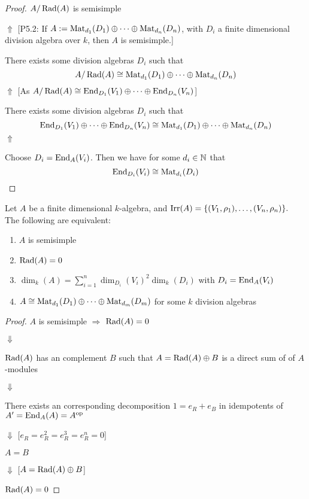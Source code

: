 \begin{proof}
\(A/\operatorname{Rad}(A)\) is semisimple

\(\Uparrow \) [P5.2: If \(A:=\operatorname{Mat}_{d_{1}}(D_{1})\oplus \cdots \oplus \operatorname{Mat}_{d_{n}}(D_{n})\), with \(D_{i}\) a finite dimensional division algebra over \(k\), then \(A\) is semisimple.]

There exists some division algebras \(D_{i}\) such that
\[
A/\operatorname{Rad}(A)\cong \operatorname{Mat}_{d_{1}}(D_{1})\oplus \cdots \oplus \operatorname{Mat}_{d_{n}}(D_{n})
\]
\(\Uparrow \) [As $A/\operatorname{Rad}(A) \cong \operatorname{End}_{D_{1}}(V_{1})\oplus \cdots \oplus \operatorname{End}_{D_{n}}(V_{n})$]

There exists some division algebras \(D_{i}\) such that
\[
\operatorname{End}_{D_{1}}(V_{1})\oplus \cdots \oplus \operatorname{End}_{D_{n}}(V_{n})\cong \operatorname{Mat}_{d_{1}}(D_{1})\oplus \cdots \oplus \operatorname{Mat}_{d_{n}}(D_{n})
\]
\(\Uparrow \)

Choose \(D_{i}=\operatorname{End}_A(V_{i})\). Then we have for some \(d_{i}\in \Bbb{N}\) that
\[
\operatorname{End}_{D_{i}}(V_{i})\cong \operatorname{Mat}_{d_{i}}(D_{i})
\]
\end{proof}

\begin{thm}
Let \(A\) be a finite dimensional \(k\)-algebra, and \(\operatorname{Irr}(A)=\{(V_{1},\rho _{1}),\ldots ,(V_{n},\rho _{n})\}.\) The following are equivalent:

\begin{enumerate}
  \item \(A\) is semisimple
  \item \(\operatorname{Rad}(A)=0\)
  \item \(\dim_{k}(A)=\sum _{i=1}^n \dim_{D_{i}}(V_{i})^{2} \dim_{k}(D_{i})\) with \(D_{i}=\operatorname{End}_A(V_{i})\)
  \item \(A\cong \operatorname{Mat}_{d_{1}}(D_{1})\oplus \cdots \oplus \operatorname{Mat}_{d_{m}}(D_{m})\) for some \(k\) division algebras
\end{enumerate}
\end{thm}


\begin{proof}
\(A\) is semisimple \(\Longrightarrow \) \(\operatorname{Rad}(A)=0\)

\(\Downarrow \)

\(\operatorname{Rad}(A)\) has an complement \(B\) such that \(A=\operatorname{Rad}(A)\oplus B\) is a direct sum of of \(A\)-modules

\(\Downarrow \)

There exists an corresponding decomposition \(1=e_R+e_B\) in idempotents of \(A'=\operatorname{End}_A(A)=A^{\operatorname{op}}\)

\(\Downarrow \)  [\(e_R=e_R^2=e_R^3=e_R^n=0\)]

\(A=B\)

\(\Downarrow \) [\(A=\operatorname{Rad}(A)\oplus B\)]

\(\operatorname{Rad}(A)=0\)
\end{proof}

